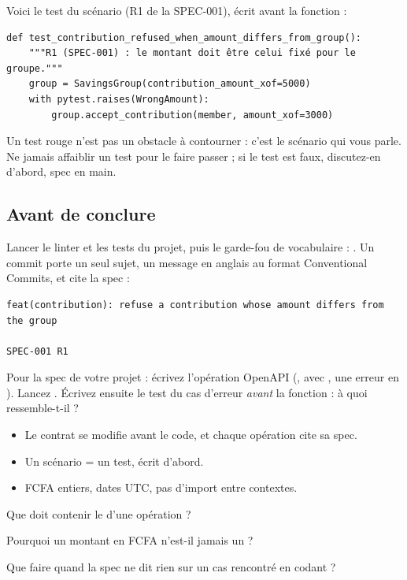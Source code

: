 Voici le test du scénario  (R1 de la SPEC-001), écrit avant la fonction :
\begin{code}
\begin{Verbatim}
def test_contribution_refused_when_amount_differs_from_group():
    """R1 (SPEC-001) : le montant doit être celui fixé pour le groupe."""
    group = SavingsGroup(contribution_amount_xof=5000)
    with pytest.raises(WrongAmount):
        group.accept_contribution(member, amount_xof=3000)
\end{Verbatim}
\end{code}

\begin{piege}
Un test rouge n'est pas un obstacle à contourner : c'est le scénario qui vous parle. Ne jamais affaiblir un test pour le
faire passer ; si le test est faux, discutez-en d'abord, spec en main.
\end{piege}

\subsection*{Avant de conclure}
Lancer le linter et les tests du projet, puis le garde-fou de vocabulaire :
. Un commit porte un seul sujet, un message en anglais au format
Conventional Commits, et cite la spec :
\begin{code}
\begin{Verbatim}
feat(contribution): refuse a contribution whose amount differs from the group

SPEC-001 R1
\end{Verbatim}
\end{code}

\begin{vousjouez}
Pour la spec de votre projet : écrivez l'opération OpenAPI (,  avec , une erreur en
). Lancez . Écrivez ensuite le test du cas d'erreur \emph{avant} la fonction : à quoi ressemble-t-il ?
\end{vousjouez}

\begin{retenir}[À retenir]
\begin{itemize}
  \item Le contrat se modifie avant le code, et chaque opération cite sa spec.
  \item Un scénario = un test, écrit d'abord.
  \item FCFA entiers, dates UTC, pas d'import entre contextes.
\end{itemize}
\end{retenir}

\begin{acquis}
  \item Que doit contenir le  d'une opération ?
  \item Pourquoi un montant en FCFA n'est-il jamais un  ?
  \item Que faire quand la spec ne dit rien sur un cas rencontré en codant ?
\end{acquis}
